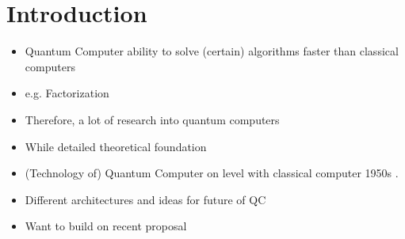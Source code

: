 \chapter{Introduction}



\begin{itemize}
    \item Quantum Computer ability to solve (certain) algorithms faster than classical computers
    \item e.g. Factorization
    \item Therefore, a lot of research into quantum computers  
    \item While detailed theoretical foundation
    \item (Technology of) Quantum Computer on level with classical computer 1950s \cite{CFM17}.
    \item Different architectures and ideas for future of QC
    \item Want to build on recent proposal 

\end{itemize}
